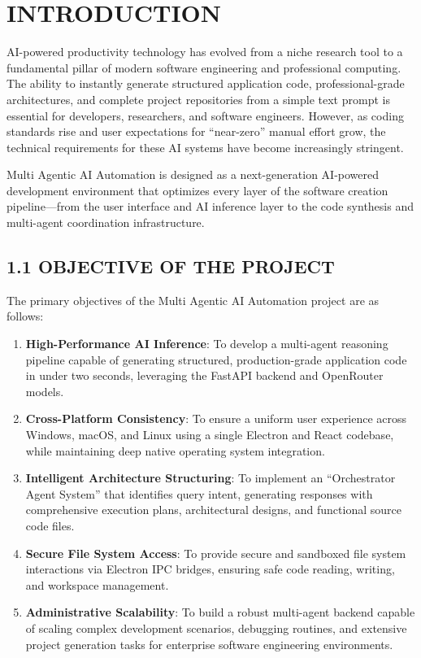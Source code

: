 \documentclass[
  12pt,
]{article}
\providecommand{\tightlist}{%
  \setlength{\itemsep}{0pt}\setlength{\parskip}{0pt}}
\begin{document}
\newpage

\setcounter{table}{0}
\setcounter{figure}{0}

\section{INTRODUCTION}\label{introduction}

AI-powered productivity technology has evolved from a niche research
tool to a fundamental pillar of modern software engineering and
professional computing. The ability to instantly generate structured
application code, professional-grade architectures, and complete project
repositories from a simple text prompt is essential for developers,
researchers, and software engineers. However, as coding standards rise
and user expectations for ``near-zero'' manual effort grow, the
technical requirements for these AI systems have become increasingly
stringent.

Multi Agentic AI Automation is designed as a next-generation AI-powered
development environment that optimizes every layer of the software
creation pipeline---from the user interface and AI inference layer to
the code synthesis and multi-agent coordination infrastructure.

\subsection{1.1 OBJECTIVE OF THE
PROJECT}\label{objective-of-the-project}

The primary objectives of the Multi Agentic AI Automation project are as
follows:

\begin{enumerate}
\def\labelenumi{\arabic{enumi}.}
\tightlist
\item
  \textbf{High-Performance AI Inference}: To develop a multi-agent
  reasoning pipeline capable of generating structured, production-grade
  application code in under two seconds, leveraging the FastAPI backend
  and OpenRouter models.
\item
  \textbf{Cross-Platform Consistency}: To ensure a uniform user
  experience across Windows, macOS, and Linux using a single Electron
  and React codebase, while maintaining deep native operating system
  integration.
\item
  \textbf{Intelligent Architecture Structuring}: To implement an
  ``Orchestrator Agent System'' that identifies query intent, generating
  responses with comprehensive execution plans, architectural designs,
  and functional source code files.
\item
  \textbf{Secure File System Access}: To provide secure and sandboxed
  file system interactions via Electron IPC bridges, ensuring safe code
  reading, writing, and workspace management.
\item
  \textbf{Administrative Scalability}: To build a robust multi-agent
  backend capable of scaling complex development scenarios, debugging
  routines, and extensive project generation tasks for enterprise
  software engineering environments.
\end{enumerate}
\end{document}
